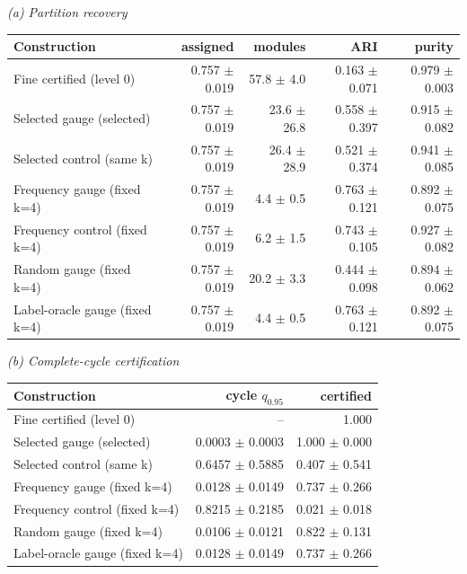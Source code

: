\begingroup\scriptsize\setlength{\tabcolsep}{2.5pt}
\textit{(a) Partition recovery}\par\smallskip
\begin{tabularx}{\textwidth}{@{}Xrrrr@{}}
\toprule
Construction & assigned & modules & ARI & purity \\
\midrule
Fine certified (level 0) & 0.757 $\pm$ 0.019 & 57.8 $\pm$ 4.0 & 0.163 $\pm$ 0.071 & 0.979 $\pm$ 0.003 \\
Selected gauge (selected) & 0.757 $\pm$ 0.019 & 23.6 $\pm$ 26.8 & 0.558 $\pm$ 0.397 & 0.915 $\pm$ 0.082 \\
Selected control (same k) & 0.757 $\pm$ 0.019 & 26.4 $\pm$ 28.9 & 0.521 $\pm$ 0.374 & 0.941 $\pm$ 0.085 \\
Frequency gauge (fixed k=4) & 0.757 $\pm$ 0.019 & 4.4 $\pm$ 0.5 & 0.763 $\pm$ 0.121 & 0.892 $\pm$ 0.075 \\
Frequency control (fixed k=4) & 0.757 $\pm$ 0.019 & 6.2 $\pm$ 1.5 & 0.743 $\pm$ 0.105 & 0.927 $\pm$ 0.082 \\
Random gauge (fixed k=4) & 0.757 $\pm$ 0.019 & 20.2 $\pm$ 3.3 & 0.444 $\pm$ 0.098 & 0.894 $\pm$ 0.062 \\
Label-oracle gauge (fixed k=4) & 0.757 $\pm$ 0.019 & 4.4 $\pm$ 0.5 & 0.763 $\pm$ 0.121 & 0.892 $\pm$ 0.075 \\
\bottomrule
\end{tabularx}
\par\medskip
\textit{(b) Complete-cycle certification}\par\smallskip
\begin{tabularx}{\textwidth}{@{}Xrr@{}}
\toprule
Construction & cycle $q_{0.95}$ & certified \\
\midrule
Fine certified (level 0) & -- & 1.000 \\
Selected gauge (selected) & 0.0003 $\pm$ 0.0003 & 1.000 $\pm$ 0.000 \\
Selected control (same k) & 0.6457 $\pm$ 0.5885 & 0.407 $\pm$ 0.541 \\
Frequency gauge (fixed k=4) & 0.0128 $\pm$ 0.0149 & 0.737 $\pm$ 0.266 \\
Frequency control (fixed k=4) & 0.8215 $\pm$ 0.2185 & 0.021 $\pm$ 0.018 \\
Random gauge (fixed k=4) & 0.0106 $\pm$ 0.0121 & 0.822 $\pm$ 0.131 \\
Label-oracle gauge (fixed k=4) & 0.0128 $\pm$ 0.0149 & 0.737 $\pm$ 0.266 \\
\bottomrule
\end{tabularx}
\endgroup
